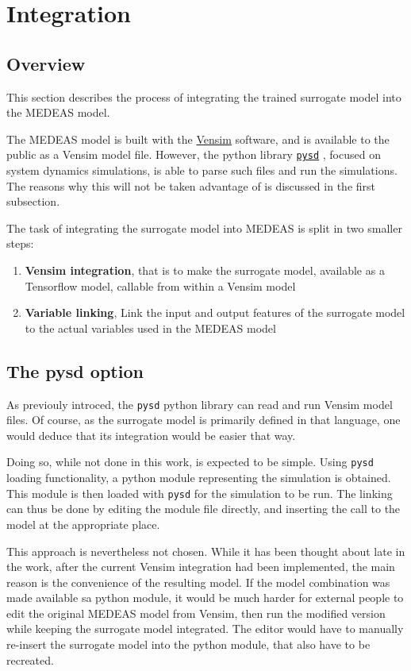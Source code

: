 \section{Integration}

\subsection{Overview}

This section describes the process of integrating the trained surrogate model into the MEDEAS model.

The MEDEAS model is built with the \href{https://vensim.com/}{Vensim} software, and is available to the public as a Vensim model file. However, the python library \href{https://pysd.readthedocs.io/en/master/index.html}{\texttt{pysd}} \cite{pysd}, focused on system dynamics simulations, is able to parse such files and run the simulations. The reasons why this will not be taken advantage of is discussed in the first subsection.

The task of integrating the surrogate model into MEDEAS is split in two smaller steps:
\begin{enumerate}
    \item \textbf{Vensim integration}, that is to make the surrogate model, available as a Tensorflow model, callable from within a Vensim model
    \item \textbf{Variable linking}, Link the input and output features of the surrogate model to the actual variables used in the MEDEAS model
\end{enumerate}

\subsection{The pysd option}

As previouly introced, the \texttt{pysd} python library can read and run Vensim model files. Of course, as the surrogate model is primarily defined in that language, one would deduce that its integration would be easier that way.

Doing so, while not done in this work, is expected to be simple. Using \texttt{pysd} loading functionality, a python module representing the simulation is obtained. This module is then loaded with \texttt{pysd} for the simulation to be run. The linking can thus be done by editing the module file directly, and inserting the call to the model at the appropriate place. 

This approach is nevertheless not chosen. While it has been thought about late in the work, after the current Vensim integration had been implemented, the main reason is the convenience of the resulting model. If the model combination was made available sa python module, it would be much harder for external people to edit the original MEDEAS model from Vensim, then run the modified version while keeping the surrogate model integrated. The editor would have to manually re-insert the surrogate model into the python module, that also have to be recreated.

